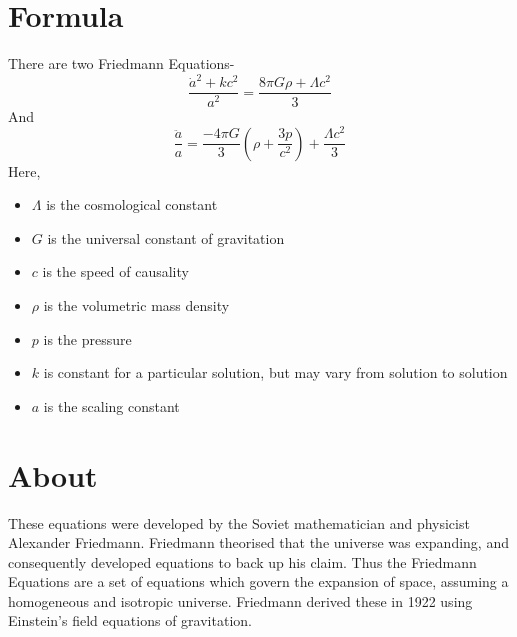 %

%

\section{Formula}
There are two Friedmann Equations-
\begin{equation} 
\label{eqn1}
\frac{\dot{a}^2 + k c^2}{a^2} = \frac{8 \pi G \rho + \Lambda c^2}{3}
\end{equation} 
And
\begin{equation}
\label{eqn2}
\frac{\ddot{a}}{a} = \frac{-4 \pi G}{3} \left(\rho + \frac{3p} {c^2}\right) + \frac{\Lambda c^2}{3}
\end{equation}
Here,
\begin{itemize}
    \item $\Lambda$ is the cosmological constant
    \item $G$ is the universal constant of gravitation
    \item $c$ is the speed of causality
    \item $\rho$ is the volumetric mass density
    \item $p$ is the pressure
    \item $k$ is constant for a particular solution, but may vary from solution to solution
    \item $a$ is the scaling constant
\end{itemize}

\section{About}
These equations were developed by the Soviet mathematician and physicist Alexander Friedmann. Friedmann theorised that the universe was expanding, and consequently developed equations to back up his claim.
Thus the Friedmann Equations are a set of equations which govern the expansion of space, assuming a homogeneous and isotropic universe. Friedmann derived these in 1922 using Einstein's field equations of gravitation.
